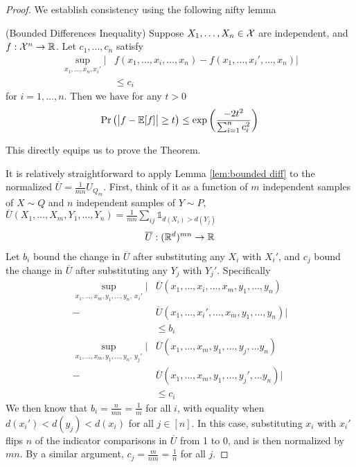 \begin{proof}
We establish consistency using the following nifty lemma 
\begin{lemma}{(Bounded Differences Inequality)}
\label{lem:bounded diff}
Suppose $X_1, \dots, X_n \in \mathcal{X}$	are independent, and $f:\mathcal{X}^n \rightarrow {\mathbb R}$. Let $c_1, \dots, c_n$ satisfy 
\begin{align*}
	\sup_{x_1, \dots, x_n, x_i'} \big| &f(x_1, \dots, x_i, \dots, x_n) - f(x_1, \dots, x_i', \dots, x_n) \big| \\
	&\leq c_i
\end{align*}
for $i = 1, \dots, n$. Then we have for any $t > 0$
\begin{align}
	\Pr\big(\big| f - {\mathbb E}[f]\big| \geq t\big) \leq \exp\bigg( \frac{-2t^2}{\sum_{i=1}^n c_i^2} \bigg) \label{eqn:bounded diff}
\end{align}
\end{lemma}

This directly equips us to prove the Theorem. 

It is relatively straightforward to apply Lemma \ref{lem:bounded diff} to the normalized $\overline{U} = \frac{1}{mn} U_{Q_m}$. First, think of it as a function of $m$ independent samples of $X \sim Q$ and $n$ independent samples of $Y \sim P$, $\overline{U}(X_1, \dots, X_m, Y_1, \dots, Y_n) = \frac{1}{mn} \sum_{ij} \mathds{1}_{d(X_i) > d(Y_j)}$
\begin{align*}
	\overline{U}: ({\mathbb R}^{d})^{mn} \rightarrow {\mathbb R} 
\end{align*}
Let $b_i$ bound the change in $\overline{U}$ after substituting any $X_i$ with $X_i'$, and $c_j$ bound the change in $\overline{U}$ after substituting any $Y_j$ with $Y_j'$. Specifically 
\begin{align*}
	\sup_{x_1, \dots, x_m, y_1, \dots, y_n,\  x_i'} \big| &\overline{U}(x_1, \dots, x_i, \dots, x_m, y_1, \dots, y_n) \\
	- &\overline{U}(x_1, \dots, x_i', \dots, x_m, y_1, \dots, y_n)\big| \\
	&\leq b_i \\
	\sup_{x_1, \dots, x_m, y_1, \dots, y_n,\  y_j'} \big| &\overline{U}(x_1, \dots, x_m, y_1, \dots, y_j, \dots  y_n) \\
	- &\overline{U}(x_1, \dots, x_m, y_1, \dots, y_j', \dots  y_n)\big| \\
	&\leq c_i
\end{align*}
We then know that $b_i = \frac{n}{mn} = \frac{1}{m}$ for all $i$, with equality when $d(x_i') < d(y_j) < d(x_i)$ for all $j \in [n]$. In this case, substituting $x_i$ with $x_i'$ flips $n$ of the indicator comparisons in $\overline{U}$ from 1 to 0, and is then normalized by $mn$. By a similar argument, $c_j = \frac{m}{nm} = \frac{1}{n}$ for all $j$. 


\end{proof}

